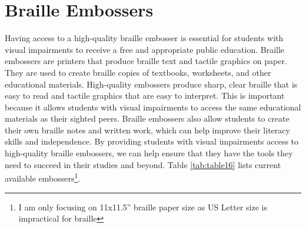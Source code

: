 \pagebreak\hypertarget{embossers}{}\section{Braille Embossers}\label{embossers}
Having access to a high-quality braille embosser is essential for students with visual impairments to receive a free and appropriate public education. Braille embossers are printers that produce braille text and tactile graphics on paper. They are used to create braille copies of textbooks, worksheets, and other educational materials. High-quality embossers produce sharp, clear braille that is easy to read and tactile graphics that are easy to interpret. This is important because it allows students with visual impairments to access the same educational materials as their sighted peers. Braille embossers also allow students to create their own braille notes and written work, which can help improve their literacy skills and independence. By providing students with visual impairments access to high-quality braille embossers, we can help ensure that they have the tools they need to succeed in their studies and beyond. Table \ref{tab:table16} lists current available embossers\footnote{\raggedright I am only focusing on 11x11.5'' braille paper size as US Letter size is impractical for braille}.

